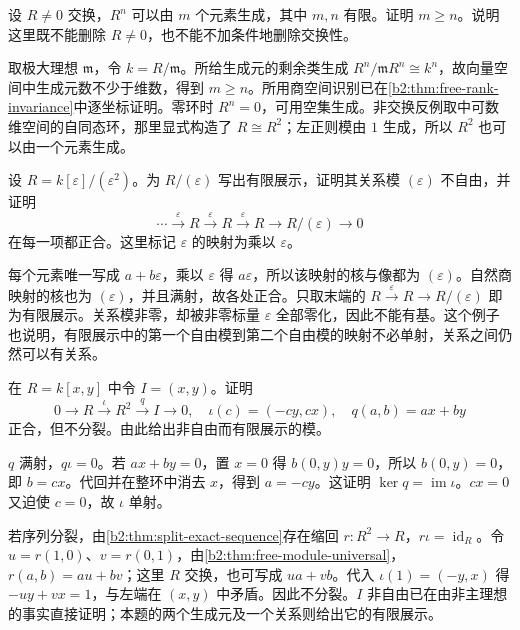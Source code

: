 \begin{exercise}\label{b2:ex:03-minimal-free-generators}
	设 \(R\ne0\) 交换，\(R^n\) 可以由 \(m\) 个元素生成，其中 \(m,n\) 有限。证明 \(m\ge n\)。说明这里既不能删除 \(R\ne0\)，也不能不加条件地删除交换性。
\end{exercise}
\begin{solution}
	取极大理想 \(\mathfrak m\)，令 \(k=R/\mathfrak m\)。所给生成元的剩余类生成 \(R^n/\mathfrak mR^n\cong k^n\)，故向量空间中生成元数不少于维数，得到 \(m\ge n\)。所用商空间识别已在\cref{b2:thm:free-rank-invariance}中逐坐标证明。零环时 \(R^n=0\)，可用空集生成。非交换反例取中可数维空间的自同态环，那里显式构造了 \(R\cong R^2\)；左正则模由 \(1\) 生成，所以 \(R^2\) 也可以由一个元素生成。
\end{solution}

\begin{exercise}\label{b2:ex:03-dual-number-presentation}
	设 \(R=k[\varepsilon]/(\varepsilon^2)\)。为 \(R/(\varepsilon)\) 写出有限展示，证明其关系模 \((\varepsilon)\) 不自由，并证明
	\[
		\cdots\xrightarrow{\varepsilon}R\xrightarrow{\varepsilon}R \xrightarrow{\varepsilon}R\longrightarrow R/(\varepsilon)\longrightarrow0
	\]
	在每一项都正合。这里标记 \(\varepsilon\) 的映射为乘以 \(\varepsilon\)。
\end{exercise}
\begin{solution}
	每个元素唯一写成 \(a+b\varepsilon\)，乘以 \(\varepsilon\) 得 \(a\varepsilon\)，所以该映射的核与像都为 \((\varepsilon)\)。自然商映射的核也为 \((\varepsilon)\)，并且满射，故各处正合。只取末端的 \(R\xrightarrow{\varepsilon}R\to R/(\varepsilon)\) 即为有限展示。关系模非零，却被非零标量 \(\varepsilon\) 全部零化，因此不能有基。这个例子也说明，有限展示中的第一个自由模到第二个自由模的映射不必单射，关系之间仍然可以有关系。
\end{solution}

\begin{exercise}\label{b2:ex:03-two-variable-relations}
	在 \(R=k[x,y]\) 中令 \(I=(x,y)\)。证明
	\[
		0\longrightarrow R\xrightarrow{\iota}R^2\xrightarrow{q}I\longrightarrow0, \quad \iota(c)=(-cy,cx),\quad q(a,b)=ax+by
	\]
	正合，但不分裂。由此给出非自由而有限展示的模。
\end{exercise}
\begin{solution}
	\(q\) 满射，\(q\iota=0\)。若 \(ax+by=0\)，置 \(x=0\) 得 \(b(0,y)y=0\)，所以 \(b(0,y)=0\)，即 \(b=cx\)。代回并在整环中消去 \(x\)，得到 \(a=-cy\)。这证明 \(\ker q=\operatorname{im}\iota\)。\(cx=0\) 又迫使 \(c=0\)，故 \(\iota\) 单射。

	若序列分裂，由\cref{b2:thm:split-exact-sequence}存在缩回 \(r:R^2\to R\)，\(r\iota=\operatorname{id}_R\)。令 \(u=r(1,0)\)、\(v=r(0,1)\)，由\cref{b2:thm:free-module-universal}，\(r(a,b)=au+bv\)；这里 \(R\) 交换，也可写成 \(ua+vb\)。代入 \(\iota(1)=(-y,x)\) 得 \(-uy+vx=1\)，与左端在 \((x,y)\) 中矛盾。因此不分裂。\(I\) 非自由已在由非主理想的事实直接证明；本题的两个生成元及一个关系则给出它的有限展示。
\end{solution}

